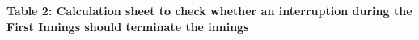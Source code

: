 \documentclass[12pt]{article}
\begin{document}
\vspace{\baselineskip}

\vspace{\baselineskip}

\vspace{\baselineskip}

\vspace{\baselineskip}

\vspace{\baselineskip}
\begin{Center}
{\fontsize{8pt}{9.6pt}\par}
\end{Center}\par


\vspace{\baselineskip}

\vspace{\baselineskip}
{\fontsize{9pt}{10.8pt}\selectfont \textbf{Table 2: Calculation sheet to check whether an interruption during the First Innings should terminate the innings}\par}\par


\vspace{\baselineskip}


\end{document}

